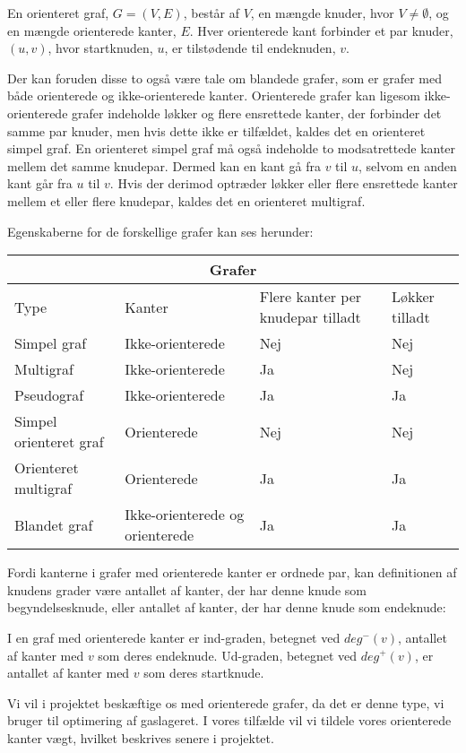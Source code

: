 \begin{defn}

En orienteret graf, $G=(V,E)$, består af $V$, en mængde knuder, hvor $V \neq \emptyset$, og en mængde orienterede kanter, $E$. Hver orienterede kant forbinder et par knuder, $(u,v)$, hvor startknuden, $u$, er tilstødende til endeknuden, $v$. 
\end{defn}



Der kan foruden disse to også være tale om blandede grafer, som er grafer med både orienterede og ikke-orienterede kanter. Orienterede grafer kan ligesom ikke-orienterede grafer indeholde løkker og flere ensrettede kanter, der forbinder det samme par knuder, men hvis dette ikke er tilfældet, kaldes det en orienteret simpel graf. En orienteret simpel graf må også indeholde to modsatrettede kanter mellem det samme knudepar. Dermed kan en kant gå fra $v$ til $u$, selvom en anden kant går fra $u$ til $v$. Hvis der derimod optræder løkker eller flere ensrettede kanter mellem et eller flere knudepar, kaldes det en orienteret multigraf.  

Egenskaberne for de forskellige grafer kan ses herunder:


\begin{center}
\begin{tabular}{ |p{4cm}|p{3cm}|p{3cm}|p{2cm}|  }
 \hline
 \multicolumn{4}{|c|}{Grafer} \\
 \hline
 Type & Kanter & Flere kanter per knudepar tilladt & Løkker tilladt\\
 \hline
 Simpel graf   & Ikke-orienterede    & Nej &   Nej\\
 Multigraf &   Ikke-orienterede & Ja   & Nej\\
 Pseudograf & Ikke-orienterede & Ja &  Ja\\
 Simpel orienteret graf    & Orienterede & Nej &  Nej\\
 Orienteret multigraf &  Orienterede  & Ja & Ja\\
 Blandet graf & Ikke-orienterede og orienterede  & Ja   & Ja\\
 \hline
\end{tabular}
\end{center}

Fordi kanterne i grafer med orienterede kanter er ordnede par, kan definitionen af knudens grader være antallet af kanter, der har denne knude som begyndelsesknude, eller antallet af kanter, der har denne knude som endeknude:
\begin{defn}
I en graf med orienterede kanter er ind-graden, betegnet ved $deg^{-}(v)$, antallet af kanter med $v$ som deres endeknude. Ud-graden, betegnet ved $deg^{+}(v)$, er antallet af kanter med $v$ som deres startknude.
\end{defn}
Vi vil i projektet beskæftige os med orienterede grafer, da det er denne type, vi bruger til optimering af gaslageret. I vores tilfælde vil vi tildele vores orienterede kanter vægt, hvilket beskrives senere i projektet.
